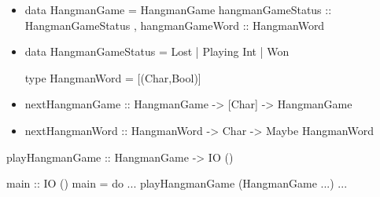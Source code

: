 \documentclass[spanish]{beamer}
\begin{document}

\begin{frame}[fragile]
  \begin{itemize}
  \item
    \begin{code}
data HangmanGame = HangmanGame
  { hangmanGameStatus :: HangmanGameStatus
  , hangmanGameWord   :: HangmanWord
  }
    \end{code}
  \item
    \begin{code}
data HangmanGameStatus
  = Lost
  | Playing Int
  | Won

type HangmanWord = [(Char,Bool)]
    \end{code}
  \end{itemize}
\end{frame}


\begin{frame}[fragile]
  \begin{itemize}
  \item
    \begin{code}
nextHangmanGame :: HangmanGame
                -> [Char]
                -> HangmanGame
    \end{code}
  \item
    \begin{code}
nextHangmanWord :: HangmanWord
                -> Char
                -> Maybe HangmanWord
    \end{code}
  \end{itemize}
\end{frame}


\begin{frame}[fragile]
  \begin{code}
playHangmanGame :: HangmanGame -> IO ()
  \end{code}
\end{frame}


\begin{frame}[fragile]
  \begin{code}
main :: IO ()
main = do
  ...
  playHangmanGame (HangmanGame ...)
  ...
  \end{code}
\end{frame}
\end{document}

